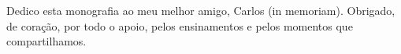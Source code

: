 \renewcommand{\dedicatorianame}{DEDICATÓRIA}

\begin{dedicatoria}
Dedico esta monografia ao meu melhor amigo, Carlos (in memoriam). Obrigado, de coração, por todo o apoio, pelos ensinamentos e pelos momentos que compartilhamos. 
\end{dedicatoria}
